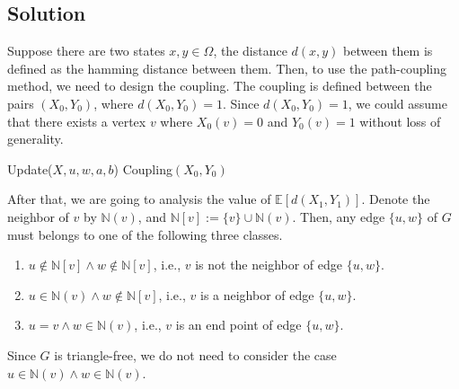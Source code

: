 \documentclass{article}
\begin{document}
\subsection{Solution}
Suppose there are two states $x, y\in\Omega$, the distance $d(x, y)$ between them is defined as the hamming distance between them.
Then, to use the path-coupling method, we need to design the coupling.
The coupling is defined between the pairs $(X_0, Y_0)$, where $d(X_0, Y_0) = 1$.
Since $d(X_0, Y_0) = 1$, we could assume that there exists a vertex $v$ where $X_0(v) = 0$ and $Y_0(v) = 1$ without loss of generality.
\begin{algorithm}[ht!]
  Update($X, u, w, a, b$)
  Coupling$(X_0, Y_0)$
\end{algorithm}


After that, we are going to analysis the value of $\mathbb{E}[d(X_1, Y_1)]$.
Denote the neighbor of $v$ by $\mathbb{N}(v)$, and $\mathbb{N}[v] := \{v\}\cup \mathbb{N}(v)$. Then, any edge $\{u, w\}$ of $G$ must belongs to one of the following three classes.
\begin{enumerate}[itemsep=0mm]
\item $u\not\in\mathbb{N}[v]\land w\not\in\mathbb{N}[v]$, i.e., $v$ is not the neighbor of edge $\{u, w\}$.
\item $u\in \mathbb{N}(v)\land w\not\in \mathbb{N}[v]$, i.e., $v$ is a neighbor of edge $\{u, w\}$.
\item $u = v\land w\in\mathbb{N}(v)$, i.e., $v$ is an end point of edge $\{u, w\}$.
\end{enumerate}
Since $G$ is triangle-free, we do not need to consider the case $u\in\mathbb{N}(v)\land w\in\mathbb{N}(v)$.
\end{document}
